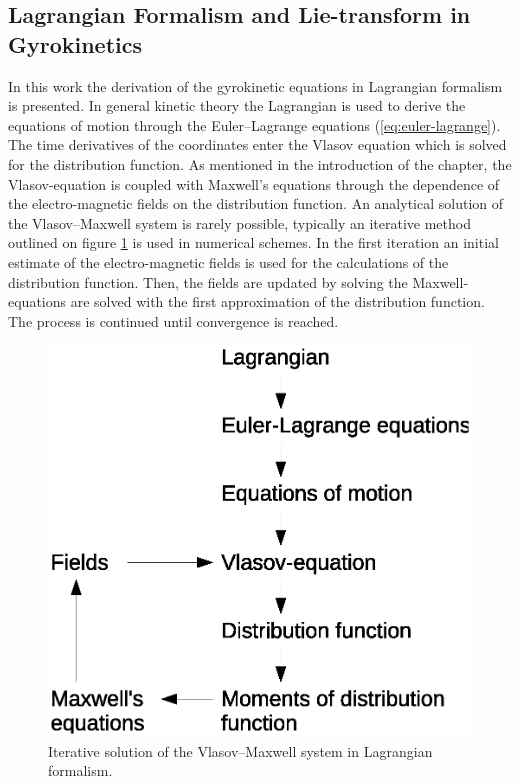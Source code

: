 \documentclass[a4paper,10pt]{article}
\begin{document}
\subsection{Lagrangian Formalism and Lie-transform in Gyrokinetics} \label{sec:lie_transform_in_gk}
In this work the derivation of the gyrokinetic equations in Lagrangian formalism is presented. In general kinetic theory the Lagrangian is used to derive the equations of motion through the Euler--Lagrange equations (\ref{eq:euler-lagrange}). The time derivatives of the coordinates enter the Vlasov equation which is solved for the distribution function. As mentioned in the introduction of the chapter, the Vlasov-equation is coupled with Maxwell's equations through the dependence of the electro-magnetic fields on the distribution function. An analytical solution of the Vlasov--Maxwell system is rarely possible, typically an iterative method outlined on figure \ref{fig:lagrangian_formalism} is used in numerical schemes. In the first iteration an initial estimate of the electro-magnetic fields is used for the calculations of the distribution function. Then, the fields are updated by solving the Maxwell-equations are solved with the first approximation of the distribution function. The process is continued until convergence is reached. 
\begin{figure}
 \begin{center}
	\includegraphics[scale=0.5]{lagrangian-formalism.eps}
 \end{center}
 \caption{Iterative solution of the Vlasov--Maxwell system in Lagrangian formalism.}
 \label{fig:lagrangian_formalism}
\end{figure}
\end{document}
